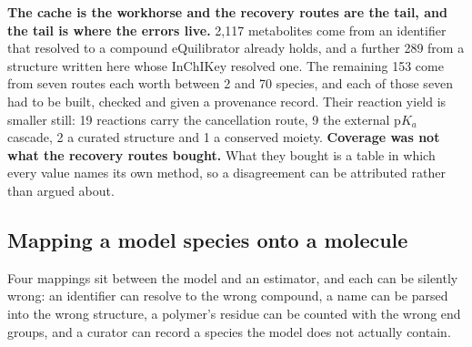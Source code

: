 



\textbf{The cache is the workhorse and the recovery routes are the tail, and the tail is
where the errors live.} 2{,}117 metabolites come from an identifier that resolved to a
compound eQuilibrator already holds, and a further 289 from a structure written here whose
InChIKey resolved one. The remaining 153 come from seven routes each worth between 2 and 70
species, and each of those seven had to be built, checked and given a provenance record.
Their reaction yield is smaller still: 19 reactions carry the cancellation route, 9 the
external p$K_a$ cascade, 2 a curated structure and 1 a conserved moiety.
\textbf{Coverage was not what the recovery routes bought.} What they bought is a table in
which every value names its own method, so a disagreement can be attributed rather than
argued about.

\subsection{Mapping a model species onto a molecule}
\label{sec:mapping}

Four mappings sit between the model and an estimator, and each can be silently wrong: an
identifier can resolve to the wrong compound, a name can be parsed into the wrong
structure, a polymer's residue can be counted with the wrong end groups, and a curator can
record a species the model does not actually contain.


